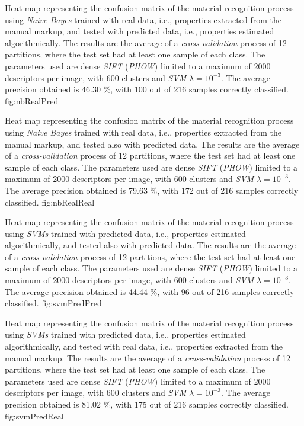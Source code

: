 {Heat map representing the confusion matrix of the material recognition process using \emph{Naive Bayes} trained with real data, i.e., properties extracted from the manual markup, and tested with predicted data, i.e., properties estimated algorithmically. The results are the average of a \emph{cross-validation} process of 12 partitions, where the test set had at least one sample of each class. The parameters used are dense \emph{SIFT} (\emph{PHOW}) limited to a maximum of 2000 descriptors per image, with 600 clusters and \emph{SVM} $\lambda=10^{-3}$. The average precision obtained is 46.30 \%, with 100 out of 216 samples correctly classified.}
{fig:nbRealPred}

{Heat map representing the confusion matrix of the material recognition process using \emph{Naive Bayes} trained with real data, i.e., properties extracted from the manual markup, and tested also with predicted data. The results are the average of a \emph{cross-validation} process of 12 partitions, where the test set had at least one sample of each class. The parameters used are dense \emph{SIFT} (\emph{PHOW}) limited to a maximum of 2000 descriptors per image, with 600 clusters and \emph{SVM} $\lambda=10^{-3}$. The average precision obtained is 79.63 \%, with 172 out of 216 samples correctly classified.}
{fig:nbRealReal}


{Heat map representing the confusion matrix of the material recognition process using \emph{SVMs} trained with predicted data, i.e., properties estimated algorithmically, and tested also with predicted data. The results are the average of a \emph{cross-validation} process of 12 partitions, where the test set had at least one sample of each class. The parameters used are dense \emph{SIFT} (\emph{PHOW}) limited to a maximum of 2000 descriptors per image, with 600 clusters and \emph{SVM} $\lambda=10^{-3}$. The average precision obtained is 44.44 \%, with 96 out of 216 samples correctly classified.}
{fig:svmPredPred}

{Heat map representing the confusion matrix of the material recognition process using \emph{SVMs} trained with predicted data, i.e., properties estimated algorithmically, and tested with real data, i.e., properties extracted from the manual markup. The results are the average of a \emph{cross-validation} process of 12 partitions, where the test set had at least one sample of each class. The parameters used are dense \emph{SIFT} (\emph{PHOW}) limited to a maximum of 2000 descriptors per image, with 600 clusters and \emph{SVM} $\lambda=10^{-3}$. The average precision obtained is 81.02 \%, with 175 out of 216 samples correctly classified.}
{fig:svmPredReal}

